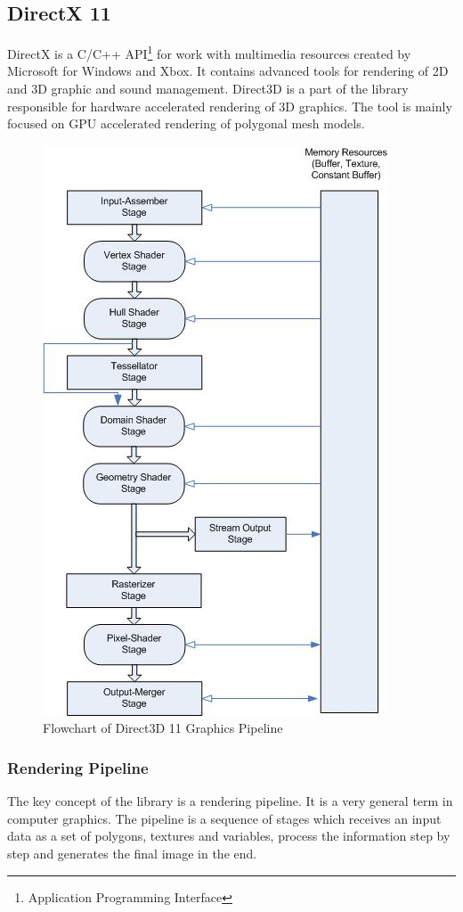 \documentclass[twoside, english, 11pt]{report}
\begin{document}
\subsection{DirectX 11}
DirectX is a C/C++ API\footnote{Application Programming Interface} for work with multimedia resources created by Microsoft for Windows and Xbox. It contains advanced tools for rendering of 2D and 3D graphic and sound management. Direct3D is a part of the library responsible for hardware accelerated rendering of 3D graphics. The tool is mainly focused on GPU accelerated rendering of polygonal mesh models.\\
 \begin{figure}[!h]
\centerline{\includegraphics[scale=0.9]{img/pipeline}}
\caption{Flowchart of Direct3D 11 Graphics Pipeline\label{fig:pipeline}}
\end{figure}
\subsubsection{Rendering Pipeline}
The key concept of the library is a rendering pipeline. It is a very general term in computer graphics. The pipeline is a sequence of stages which receives an input data as a set of polygons, textures and variables, process the information step by step and generates the final image in the end.\\
\end{document}
